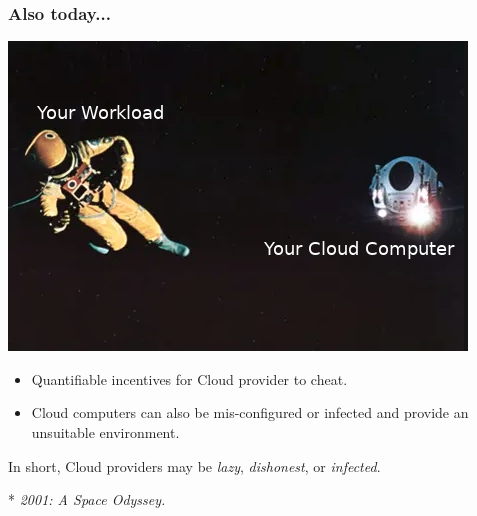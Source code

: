 \documentclass[aspectratio=169] {beamer}
\begin{document}
\begin{frame}\frametitle{Also today...}
\vfill
	\begin{minipage}{7cm}
		\includegraphics[scale=.4]{bilder/lost}
	\end{minipage}%
	\begin{minipage}{6cm}
		\begin{itemize}
			\item Quantifiable incentives for Cloud provider to cheat.
			\item Cloud computers can also be mis-configured or infected and provide an unsuitable environment.
		\end{itemize}
		In short, Cloud providers may be \emph{lazy}, \emph{dishonest}, or \emph{infected}.
	\end{minipage}
	\vfill
	{\scriptsize
	* \emph{2001: A Space Odyssey.}
	}
\end{frame}
\end{document}
